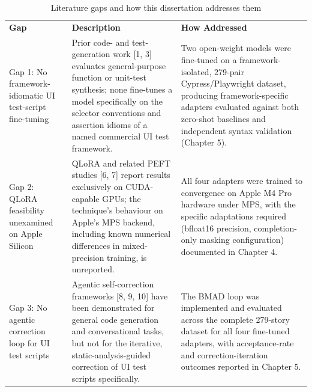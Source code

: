 \begin{longtable}[]{@{}lll@{}}
\caption{Literature gaps and how this dissertation addresses them}\tabularnewline
\toprule
\endhead
\textbf{Gap} & \textbf{Description} & \textbf{How Addressed} \\
Gap 1: No framework-idiomatic UI test-script fine-tuning & Prior code-
and test-generation work {[}1, 3{]} evaluates general-purpose function
or unit-test synthesis; none fine-tunes a model specifically on the
selector conventions and assertion idioms of a named commercial UI test
framework. & Two open-weight models were fine-tuned on a
framework-isolated, 279-pair Cypress/Playwright dataset, producing
framework-specific adapters evaluated against both zero-shot baselines
and independent syntax validation (Chapter 5). \\
Gap 2: QLoRA feasibility unexamined on Apple Silicon & QLoRA and related
PEFT studies {[}6, 7{]} report results exclusively on CUDA-capable GPUs;
the technique's behaviour on Apple's MPS backend, including known
numerical differences in mixed-precision training, is unreported. & All
four adapters were trained to convergence on Apple M4 Pro hardware under
MPS, with the specific adaptations required (bfloat16 precision,
completion-only masking configuration) documented in Chapter 4. \\
Gap 3: No agentic correction loop for UI test scripts & Agentic
self-correction frameworks {[}8, 9, 10{]} have been demonstrated for
general code generation and conversational tasks, but not for the
iterative, static-analysis-guided correction of UI test scripts
specifically. & The BMAD loop was implemented and evaluated across the
complete 279-story dataset for all four fine-tuned adapters, with
acceptance-rate and correction-iteration outcomes reported in Chapter
5. \\
\bottomrule
\end{longtable}
